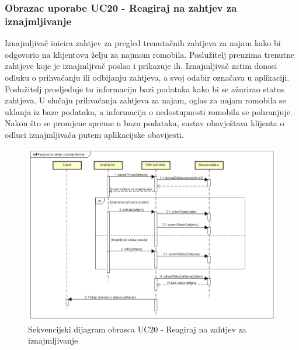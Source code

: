 				\eject

				\subsubsection{Obrazac uporabe UC20 - Reagiraj na zahtjev za iznajmljivanje}
				Iznajmljivač inicira zahtjev za pregled trenutačnih zahtjeva za najam kako bi odgovorio na klijentovu želju za najmom romobila. Poslužitelj preuzima trenutne zahtjeve koje je iznajmljivač poslao i prikazuje ih. Iznajmljivač zatim donosi odluku o prihvaćanju ili odbijanju zahtjeva, a svoj odabir označava u aplikaciji. Poslužitelj prosljeđuje tu informaciju bazi podataka kako bi se ažurirao status zahtjeva. U slučaju prihvaćanja zahtjeva za najam, oglas za najam romobila se uklanja iz baze podataka, a informacija o nedostupnosti romobila se pohranjuje. Nakon što se promjene spreme u bazu podataka, sustav obavještava klijenta o odluci iznajmljivača putem aplikacijske obavijesti.
				
				\begin{figure} [H]
					
					\includegraphics[width=1\linewidth]{dijagrami/UC20 - Reagiraj na zahtjev za iznajmljivanje.png}
					\centering
					\caption{Sekvencijski dijagram obrasca UC20 - Reagiraj na zahtjev za iznajmljivanje}
					\label{fig:Sekvencijski dijagram obrasca UC20 - Reagiraj na zahtjev za iznajmljivanje}
				\end{figure}
				
				\eject

